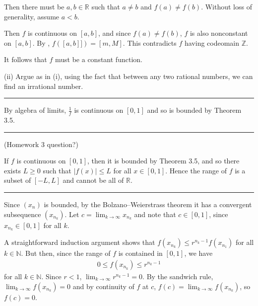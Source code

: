 \documentclass[letterpaper,10pt,english]{jupyterBook}
\begin{document}
\sphinxAtStartPar
Then there must be \(a,b\in\mathbb{R}\) such that \(a\neq b\) and \(f(a)\neq f(b)\). Without loss of generality, assume \(a<b\).

\sphinxAtStartPar
Then \(f\) is continuous on \([a,b]\), and since \(f(a)\neq f(b)\), \(f\) is also non\sphinxhyphen{}constant on \([a,b]\). By , \(f([a,b]])=[m,M]\). This contradicts \(f\) having codeomain \(\mathbb{Z}\).

\sphinxAtStartPar
It follows that \(f\) must be a constant function.

\sphinxAtStartPar
(ii) Argue as in (i), using the fact that between any two rational numbers, we can find an irrational number.


\bigskip\hrule\bigskip


\sphinxAtStartPar
{\hyperref[\detokenize{Problems:id28}]{}} By algebra of limits, \(\frac{1}{f}\) is continuous on \([0, 1]\) and so is bounded by Theorem 3.5.


\bigskip\hrule\bigskip


\sphinxAtStartPar
{\hyperref[\detokenize{Problems:id29}]{}} (Homework 3 question?)

If \(f\) is continuous on \([0, 1]\), then it is bounded by Theorem 3.5, and so there exists \(L \geq 0\) such that \(|f(x)| \leq L\) for all \(x \in [0, 1]\). Hence the range of \(f\) is a subset of  \([-L, L]\) and cannot be all of \(\mathbb{R}\).


\bigskip\hrule\bigskip


\sphinxAtStartPar
{\hyperref[\detokenize{Problems:id30}]{}} Since \((x_{n})\) is bounded, by the Bolzano–Weierstrass theorem it has a convergent subsequence \((x_{n_{k}})\). Let \(c=\lim_{k \rightarrow \infty}x_{n_{k}}\) and note that \(c \in [0, 1]\), since \(x_{n_k}\in[0,1]\) for all \(k\).

A straight\sphinxhyphen{}forward induction argument shows that \(f(x_{n_{k}}) \leq r^{n_{k}-1}f(x_{n_{1}})\) for all \(k\in\mathbb{N}\). But then, since the range of \(f\) is contained in \([0,1]\), we have
\begin{equation*}
\begin{split}
0 \leq f(x_{n_{k}}) \leq r^{n_{k}-1}
\end{split}
\end{equation*}
\sphinxAtStartPar
for all \(k\in\mathbb{N}\). Since \(r < 1\), \(\lim_{k\to\infty} r^{n_k-1} =0\). By the sandwich rule, \( \lim_{k \rightarrow \infty}f(x_{n_{k}}) = 0\) and by continuity of \(f\) at \(c\), \(f(c) = \lim_{k \rightarrow \infty}f(x_{n_{k}})\), so \(f(c)=0\).
\end{document}
